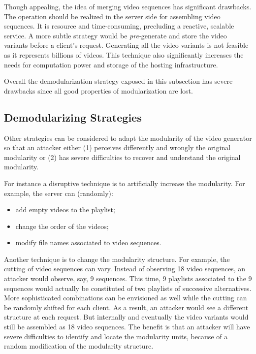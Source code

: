 
Though appealing, the idea of merging video sequences has significant drawbacks. The operation should be realized in the server side for assembling video sequences. It is resource and time-consuming, precluding a reactive, scalable service. A more subtle strategy would be \emph{pre-}generate and store the video variants before a client's request. Generating all the video variants is not feasible as it represents billions of videos. 
This technique also significantly increases the needs for computation power and storage of the hosting infrastructure.

Overall the demodularization strategy exposed in this subsection has severe drawbacks since all good properties of modularization are lost. 

\subsection{Demodularizing Strategies} 

Other strategies can be considered to adapt the modularity of the video generator so that an attacker either (1) perceives differently and wrongly the original modularity or (2) has severe difficulties to recover and understand the original modularity.  


For instance a disruptive technique is to artificially increase the modularity. For example, the server can (randomly):
\begin{itemize}
\item add empty videos to the playlist;
\item change the order of the videos;
\item modify file names associated to video sequences.
\end{itemize}


Another technique is to change the modularity structure. For example, the cutting of video sequences can vary. 
 Instead of observing 18 video sequences, an attacker would observe, say, 9 sequences. 
This time, 9 playlists associated to the 9 sequences would actually be constituted of two playlists of successive alternatives.  
More sophisticated combinations can be envisioned as well while the cutting can be randomly shifted for each client. As a result, an attacker would see a different structure at each request. But internally and eventually the video variants would still be assembled as 18 video sequences. 
The benefit is that an attacker will have severe difficulties to identify and locate the modularity units, because of a random modification of the modularity structure. 
 
